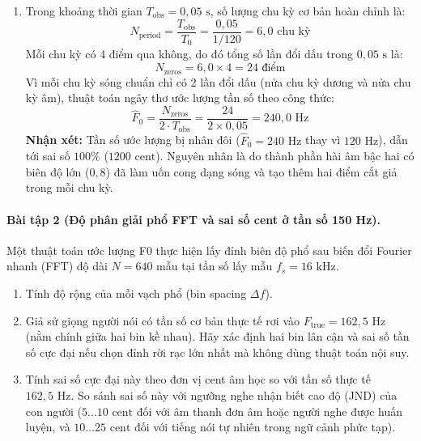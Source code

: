 \begin{enumerate}[label=\alph*)]
    \item Trong khoảng thời gian $T_{\text{obs}} = 0{,}05\text{ s}$, số lượng chu kỳ cơ bản hoàn chỉnh là:
    \begin{equation}
        N_{\text{period}} = \frac{T_{\text{obs}}}{T_0} = \frac{0{,}05}{1/120} = 6{,}0\text{ chu kỳ}
    \end{equation}
    Mỗi chu kỳ có 4 điểm qua không, do đó tổng số lần đổi dấu trong $0{,}05\text{ s}$ là:
    \begin{equation}
        N_{\text{zeros}} = 6{,}0 \times 4 = 24\text{ điểm}
    \end{equation}
    Vì mỗi chu kỳ sóng chuẩn chỉ có 2 lần đổi dấu (nửa chu kỳ dương và nửa chu kỳ âm), thuật toán ngây thơ ước lượng tần số theo công thức:
    \begin{equation}
        \hat{F}_0 = \frac{N_{\text{zeros}}}{2 \cdot T_{\text{obs}}} = \frac{24}{2 \times 0{,}05} = 240{,}0\text{ Hz}
    \end{equation}
    \textbf{Nhận xét:} Tần số ước lượng bị nhân đôi ($\hat{F}_0 = 240\text{ Hz}$ thay vì $120\text{ Hz}$), dẫn tới sai số $100\%$ ($1200\text{ cent}$). Nguyên nhân là do thành phần hài âm bậc hai có biên độ lớn ($0{,}8$) đã làm uốn cong dạng sóng và tạo thêm hai điểm cắt giả trong mỗi chu kỳ.
\end{enumerate}

\paragraph{Bài tập 2 (Độ phân giải phổ FFT và sai số cent ở tần số 150 Hz).}
Một thuật toán ước lượng F0 thực hiện lấy đỉnh biên độ phổ sau biến đổi Fourier nhanh (FFT) độ dài $N = 640$ mẫu tại tần số lấy mẫu $f_s = 16\text{ kHz}$.
\begin{enumerate}[label=\alph*)]
    \item Tính độ rộng của mỗi vạch phổ (bin spacing $\Delta f$).
    \item Giả sử giọng người nói có tần số cơ bản thực tế rơi vào $F_{\text{true}} = 162{,}5\text{ Hz}$ (nằm chính giữa hai bin kề nhau). Hãy xác định hai bin lân cận và sai số tần số cực đại nếu chọn đỉnh rời rạc lớn nhất mà không dùng thuật toán nội suy.
    \item Tính sai số cực đại này theo đơn vị cent âm học so với tần số thực tế $162{,}5\text{ Hz}$. So sánh sai số này với ngưỡng nghe nhận biết cao độ (JND) của con người ($5 \dots 10\text{ cent}$ đối với âm thanh đơn âm hoặc người nghe được huấn luyện, và $10 \dots 25\text{ cent}$ đối với tiếng nói tự nhiên trong ngữ cảnh phức tạp).
\end{enumerate}

